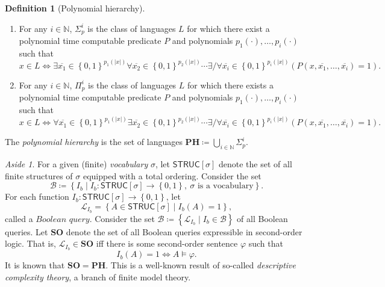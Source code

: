 \documentclass[10pt,letterpaper,cm]{nupset}
\theoremstyle{definition}
\newtheorem{definition}{Definition}[subsection]
\theoremstyle{theorem}
\theoremstyle{remark}
\newtheorem*{aside}{Aside}
\newcommand{\N}{\mathbb N}
\newcommand{\1}{\mathbf{1}}
\newcommand{\0}{\vec 0}
\begin{document}
\begin{definition}[Polynomial hierarchy]  $ $
\begin{enumerate}
\item For any $i \in \N$, $\Sigma_p^i$ is the class of languages $L$ for which there exist a polynomial time computable predicate $P$ and polynomials $p_1({\cdot}), \ldots, p_i({\cdot})$ such that $$x \in L \iff \exists \overline{x_1}\in \left\{0,1\right\}^{p_1(\left\lvert{x}\right\rvert)} \forall \overline{x_2} \in  \left\{0,1\right\}^{p_2(\left\lvert{x}\right\rvert)}\cdots \exists /\forall \overline{x_i}\in \left\{0,1\right\}^{p_i(\left\lvert{x}\right\rvert)}\left(P(x, \overline{x_1}, \ldots, \overline{x_i}) =1\right).$$  
\item For any $i \in \N$, $\Pi_p^i$ is the class of languages $L$ for which there exists a polynomial time computable predicate $P$ and polynomials $p_1({\cdot}), \ldots, p_i({\cdot})$ such that $$x \in L \iff \forall \overline{x_1}\in \left\{0,1\right\}^{p_1(\left\lvert{x}\right\rvert)} \exists \overline{x_2} \in  \left\{0,1\right\}^{p_2(\left\lvert{x}\right\rvert)}\cdots \exists /\forall \overline{x_i}\in \left\{0,1\right\}^{p_i(\left\lvert{x}\right\rvert)}\left(P(x, \overline{x_1}, \ldots, \overline{x_i}) =1\right).$$  
\end{enumerate}
The \textit{polynomial hierarchy} is the set of languages $\mathbf{PH} \coloneqq \bigcup_{i\in \N}\Sigma_p^i$.
\end{definition}

\begin{aside}
For a given (finite) \textit{vocabulary} $\sigma$, let $\mathsf{STRUC}[\sigma]$ denote the set of all  finite structures of $\sigma$ equipped with a total ordering. Consider the set $$\mathcal{B} \coloneqq \left\{I_b \mid I_b :   \mathsf{STRUC}[\sigma] \to \left\{0,1\right\},\  \sigma \text{ is a vocabulary}\right\}.$$ For each  function $I_b :  \mathsf{STRUC}[\sigma] \to \left\{0,1\right\}$, let $$\mathcal{L}_{I_b} = \left\{A \in \mathsf{STRUC}[\sigma] \mid I_b(A) = 1\right\},$$ called a $\textit{Boolean query}$. 
Consider the set $\mathcal{B} \coloneqq \left\{ \mathcal{L}_{I_b} \mid I_b \in \mathcal{B}\right\}$ of all Boolean queries. Let $\mathbf{SO}$ denote the set of all Boolean queries expressible in second-order logic. That is, $\mathcal{L}_{I_b} \in \mathbf{SO}$ iff there is some second-order sentence $\varphi$ such that $$I_b(A) =1 \iff A \models \varphi.$$ It is known that $\mathbf{SO} = \mathbf{PH}$. This is a well-known result of so-called \textit{descriptive complexity theory}, a branch of finite model theory.
\end{aside}
\end{document}
